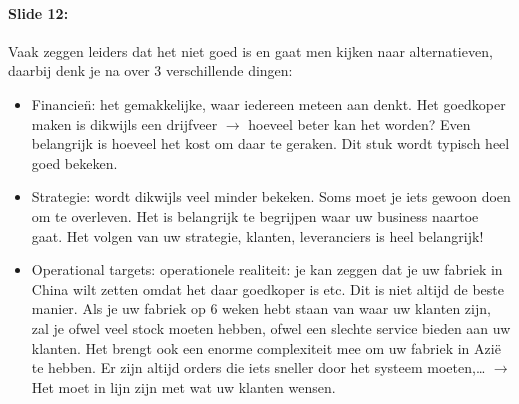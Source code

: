 \documentclass[10pt,a4paper]{report}
\begin{document}
\paragraph{Slide 12:} Vaak zeggen leiders dat het niet goed is en gaat men kijken naar alternatieven, daarbij denk je na over 3 verschillende dingen:
\begin{itemize}
\item Financie\"n: het gemakkelijke, waar iedereen meteen aan denkt. Het goedkoper maken is dikwijls een drijfveer $\rightarrow$ hoeveel beter kan het worden? Even belangrijk is hoeveel het kost om daar te geraken. Dit stuk wordt typisch heel goed bekeken.
\item Strategie: wordt dikwijls veel minder bekeken. Soms moet je iets gewoon doen om te overleven. Het is belangrijk te begrijpen waar uw business naartoe gaat. Het volgen van uw strategie, klanten, leveranciers is heel belangrijk! 
\item Operational targets: operationele realiteit: je kan zeggen dat je uw fabriek in China wilt zetten omdat het daar goedkoper is etc. Dit is niet altijd de beste manier. Als je uw fabriek op 6 weken hebt staan van waar uw klanten zijn, zal je ofwel veel stock moeten hebben, ofwel een slechte service bieden aan uw klanten. Het brengt ook een enorme complexiteit mee om uw fabriek in Azi\"e te hebben. Er zijn altijd orders die iets sneller door het systeem moeten,… $\rightarrow$ Het moet in lijn zijn met wat uw klanten wensen. 
\end{itemize}
\end{document}
